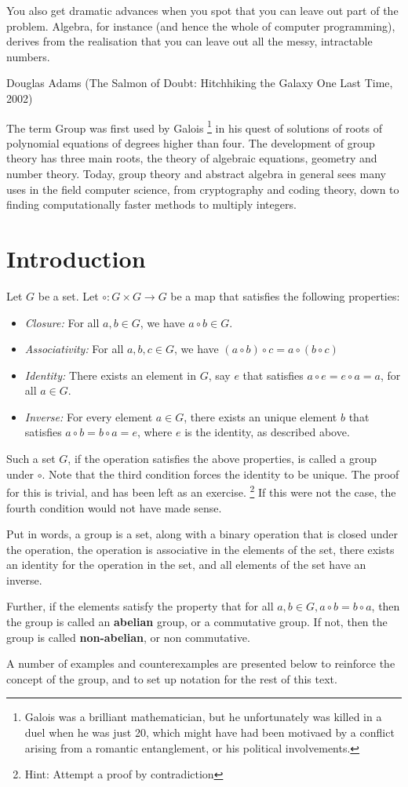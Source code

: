 \epigraph{You also get dramatic advances when you spot that you can leave out part of the problem. Algebra, for instance (and hence the whole of computer programming), derives from the realisation that you can leave out all the messy, intractable numbers.}{Douglas Adams (The Salmon of Doubt: Hitchhiking the Galaxy One Last Time, 2002)}
\par
The term Group was first used by Galois \footnote{Galois was a brilliant mathematician, but he unfortunately was killed in a duel when he was just 20, which might have had been motivaed by a conflict arising from a romantic entanglement, or his political involvements.} in his quest of solutions of roots of polynomial equations of degrees higher than four.
The development of group theory has three main roots, the theory of algebraic equations, geometry and number theory.
Today, group theory and abstract algebra in general sees many uses in the field computer science, from cryptography and coding theory, down to finding computationally faster methods to multiply integers.
\section{Introduction}
\begin{definition} \label{def:group}
  Let $G$ be a set.
  Let $ \circ : G \times G \rightarrow G $  be a map that satisfies the following properties:
  \begin{itemize}
    \item \textit{Closure:} For all $a, b \in G$, we have $a \circ b \in G$.
    \item \textit{Associativity:} For all $a, b, c \in G$, we have $(a \circ b) \circ c = a \circ (b \circ c)$
    \item \textit{Identity:} There exists an element in $G$, say $e$ that satisfies $a \circ e = e \circ a = a$, for all $a \in G$.
    \item \textit{Inverse:} For every element $a \in G$, there exists an unique element $b$ that satisfies $a \circ b = b \circ a = e$, where $e$ is the identity, as described above.
  \end{itemize}
  Such a set $G$, if the operation satisfies the above properties, is called a group under $\circ$.
  Note that the third condition forces the identity to be unique.
  The proof for this is trivial, and has been left as an exercise. \footnote{Hint: Attempt a proof by contradiction}
  If this were not the case, the fourth condition would not have made sense.
\end{definition}
Put in words, a group is a set, along with a binary operation that is closed under the operation, the operation is associative in the elements of the set, there exists an identity for the operation in the set, and all elements of the set have an inverse.
\par
Further, if the elements satisfy the property that for all $a, b \in G, a \circ b = b \circ a$, then the group is called an \textbf{abelian} group, or a commutative group.
If not, then the group is called \textbf{non-abelian}, or non commutative.
\par
A number of examples and counterexamples are presented below to reinforce the concept of the group, and to set up notation for the rest of this text.
